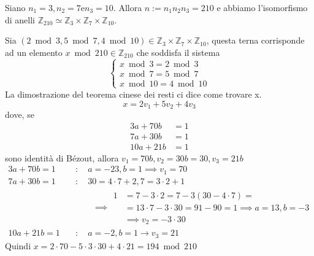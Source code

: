 \documentclass[../main.tex]{subfiles}
\begin{document}
\begin{example}
    Siano $n_1 = 3, n_2 = 7 $e$ n_3 = 10$. Allora $n := n_1 n_2 n_3 = 210$ e abbiamo l'isomorfismo di anelli $\mathbb{Z}_{210} \simeq \mathbb{Z}_3 \times \mathbb{Z}_7 \times \mathbb{Z}_{10}$.

    Sia $(2 \bmod 3, 5 \bmod 7, 4 \bmod 10) \in \mathbb{Z}_3 \times \mathbb{Z}_7 \times \mathbb{Z}_{10}$, questa terna corrisponde ad un elemento $x \bmod 210 \in \mathbb{Z}_{210}$ che soddisfa il sistema
    \begin{equation*}
        \begin{cases}
            x\bmod 3 = 2\bmod 3 \\
            x\bmod 7 = 5\bmod 7 \\
            x\bmod 10 = 4\bmod 10
        \end{cases}
    \end{equation*}
    La dimostrazione del teorema cinese dei resti ci dice come trovare x.
    \begin{equation*}
        x = 2 v_1 + 5 v_2 + 4 v_3
    \end{equation*}
    dove, se
    \begin{align*}
        3 a + 70 b  & = 1 \\
        7 a + 30 b  & = 1 \\
        10 a + 21 b & = 1
    \end{align*}
    sono identità di Bézout, allora $v_1 = 70 b, v_2 = 30 b  = 30, v_3 = 21 b$
    \begin{equation*}
        \begin{aligned}
            3 a + 70 b = 1  & \quad : \quad a = -23, b = 1 \implies v_1 = 70       \\
            7 a + 30 b = 1  & \quad : \quad 30 = 4 \cdot 7 + 2 , 7 = 3 \cdot 2 + 1 \\
                            & \quad \qquad\implies
            \begin{aligned}
                1 & = 7 - 3 \cdot 2 = 7 - 3(30 - 4 \cdot 7) =                        \\
                  & =  13 \cdot 7 - 3 \cdot 30 = 91 - 90 = 1 \implies a = 13, b = -3 \\
                  & \implies v_2 = -3 \cdot 30
            \end{aligned}   \\
            10 a + 21 b = 1 & \quad : \quad  a = -2, b = 1 \rightarrow v_3 = 21
        \end{aligned}
    \end{equation*}
    Quindi $x = 2 \cdot 70 - 5 \cdot 3 \cdot 30 + 4 \cdot 21 = 194\bmod 210$\\
\end{example}
\end{document}
